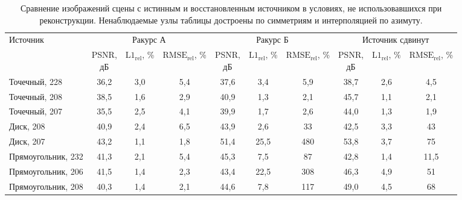 \begin{table}[htbp]
    \centering
    \footnotesize
    \setlength{\tabcolsep}{4pt}
    \caption{Сравнение изображений сцены с истинным и восстановленным источником в условиях, не использовавшихся при реконструкции. Ненаблюдаемые узлы таблицы достроены по симметриям и интерполяцией по азимуту.}
    \label{tab:generalization}
    \begin{tabular}{lccccccccc}
        \toprule
        \multirow{2}{*}{Источник} & \multicolumn{3}{c}{Ракурс А} & \multicolumn{3}{c}{Ракурс Б} & \multicolumn{3}{c}{Источник сдвинут} \\
        \cmidrule(lr){2-4}\cmidrule(lr){5-7}\cmidrule(lr){8-10}
        & \makecell{PSNR,\\дБ} & \makecell{$\mathrm{L1}_{\mathrm{rel}}$,\\\%} & \makecell{$\mathrm{RMSE}_{\mathrm{rel}}$,\\\%}
        & \makecell{PSNR,\\дБ} & \makecell{$\mathrm{L1}_{\mathrm{rel}}$,\\\%} & \makecell{$\mathrm{RMSE}_{\mathrm{rel}}$,\\\%}
        & \makecell{PSNR,\\дБ} & \makecell{$\mathrm{L1}_{\mathrm{rel}}$,\\\%} & \makecell{$\mathrm{RMSE}_{\mathrm{rel}}$,\\\%} \\
        \midrule[\heavyrulewidth]
        Точечный, 228      & 36,2 & 3,0 & 5,4 & 37,6 & 3,4  & 5,9 & 38,7 & 2,6 & 4,5 \\
        Точечный, 208      & 38,5 & 1,6 & 2,9 & 40,9 & 1,3  & 2,1 & 45,7 & 1,1 & 2,1 \\
        Точечный, 207      & 35,5 & 2,5 & 4,1 & 39,9 & 1,7  & 2,6 & 44,0 & 1,3 & 1,9 \\
        \midrule
        Диск, 208          & 40,9 & 2,4 & 6,5 & 43,9 & 2,6  & 33  & 42,5 & 3,3 & 43 \\
        Диск, 207          & 43,2 & 1,1 & 1,8 & 51,4 & 25,5 & 480 & 53,8 & 3,7 & 75 \\
        \midrule
        Прямоугольник, 232 & 41,3 & 2,1 & 5,4 & 45,3 & 7,5  & 87  & 42,8 & 1,4 & 11,5 \\
        Прямоугольник, 206 & 41,5 & 1,4 & 2,3 & 43,4 & 22,5 & 308 & 46,3 & 4,9 & 51 \\
        Прямоугольник, 208 & 40,3 & 1,4 & 2,1 & 44,6 & 7,8  & 117 & 49,0 & 4,5 & 68 \\
        \bottomrule
    \end{tabular}
\end{table}

